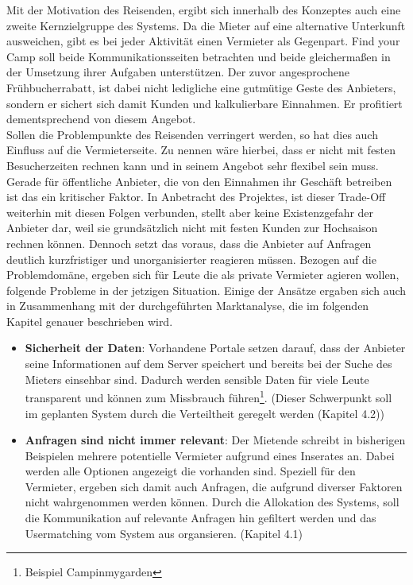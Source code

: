 Mit der Motivation des Reisenden, ergibt sich innerhalb des Konzeptes auch eine zweite Kernzielgruppe des 
Systems. Da die Mieter auf eine alternative Unterkunft ausweichen, gibt es bei jeder Aktivität einen Vermieter 
als Gegenpart. Find your Camp soll beide Kommunikationsseiten betrachten und beide gleichermaßen in der 
Umsetzung ihrer Aufgaben unterstützen. Der zuvor angesprochene Frühbucherrabatt, ist dabei nicht ledigliche 
eine gutmütige Geste des Anbieters, sondern er sichert sich damit Kunden und kalkulierbare Einnahmen. Er 
profitiert dementsprechend von diesem Angebot.\\
Sollen die Problempunkte des Reisenden verringert werden, so hat dies auch Einfluss auf die Vermieterseite. Zu 
nennen wäre hierbei, dass er nicht mit festen Besucherzeiten rechnen kann und in seinem Angebot sehr flexibel 
sein muss. Gerade für öffentliche Anbieter, die von den Einnahmen ihr Geschäft betreiben ist das ein kritischer
Faktor. In Anbetracht des Projektes, ist dieser Trade-Off weiterhin mit diesen Folgen verbunden, stellt aber 
keine Existenzgefahr der Anbieter dar, weil sie grundsätzlich nicht mit festen Kunden zur Hochsaison rechnen 
können. Dennoch setzt das voraus, dass die Anbieter auf Anfragen deutlich kurzfristiger und unorganisierter 
reagieren müssen.
Bezogen auf die Problemdomäne, ergeben sich für Leute die als private Vermieter agieren wollen, folgende Probleme in der jetzigen Situation. Einige der Ansätze ergaben sich auch in Zusammenhang mit der durchgeführten Marktanalyse, die im folgenden Kapitel genauer beschrieben wird.
\begin{itemize}
   \item \textbf{Sicherheit der Daten}: Vorhandene Portale setzen darauf, dass der Anbieter seine Informationen
auf dem Server speichert und bereits bei der Suche des Mieters einsehbar sind. Dadurch werden sensible Daten
für viele Leute transparent und können zum Missbrauch führen\footnote{Beispiel Campinmygarden}. 
   (Dieser Schwerpunkt soll im geplanten System durch die Verteiltheit geregelt werden (Kapitel 4.2))

   \item \textbf{Anfragen sind nicht immer relevant}: Der Mietende schreibt in bisherigen Beispielen mehrere potentielle Vermieter aufgrund eines Inserates an. Dabei werden alle Optionen angezeigt die vorhanden sind. Speziell für den Vermieter, ergeben sich damit auch Anfragen, die aufgrund diverser Faktoren nicht wahrgenommen werden können. Durch die Allokation des Systems, soll die Kommunikation auf relevante Anfragen hin gefiltert werden und das Usermatching vom System aus organsieren. (Kapitel 4.1)
\end{itemize}


